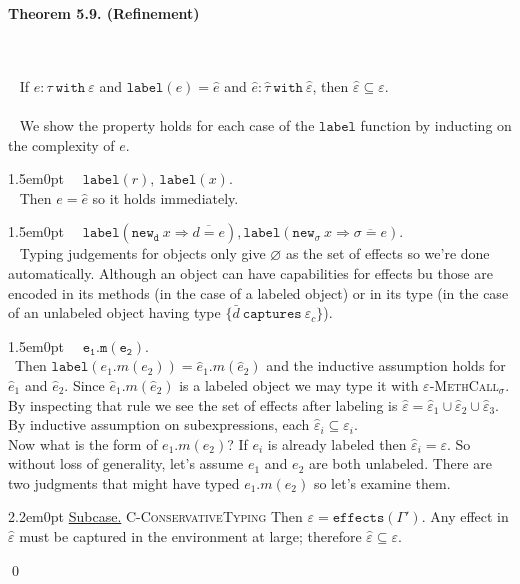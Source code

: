 \documentclass{llncs}
\newcommand{\keywadj}[1]{\mathtt{#1}}
\newcommand{\keyw}[1]{\keywadj{#1}~}
\newcommand{\thm}[3]{
	\begin{large}
		\bf{#1}
	\end{large} \\\\
	\fbox{Statement.} ~ #2
	\fbox{Proof.}~ #3 \qed
}
\newcommand{\proofcase}[2]{
	\begin{adjustwidth}{1.5em}{0pt}
		\fbox{Case.}~~#1. \\ ~#2
	\end{adjustwidth}
}
\newcommand{\subcase}[1] {
	\begin{adjustwidth}{2.2em}{0pt}
		\underline{Subcase.} #1
	\end{adjustwidth}
}
\begin{document}
\thm{Theorem 5.9. (Refinement)}
{If $e : \tau~\keyw{with} \varepsilon$ and $\keywadj{label}(e) = \hat e$ and $\hat e : \hat \tau~\keyw{with} \hat \varepsilon$, then $\hat \varepsilon \subseteq \varepsilon$.\\\\}
{We show the property holds for each case of the $\keywadj{label}$ function by inducting on the complexity of $e$.

\proofcase{$\keywadj{label}(r),~\keywadj{label}(x)$}{
	Then $e = \hat e$ so it holds immediately.
}
	
\proofcase{$\keywadj{label}(\keyw{new_d} x \Rightarrow \overline{d = e}), \keywadj{label}(\keyw{new_\sigma} x \Rightarrow \overline{\sigma = e})$}{
Typing judgements for objects only give $\varnothing$ as the set of effects so we're done automatically. Although an object can have capabilities for effects bu those are encoded in its methods (in the case of a labeled object) or in its type (in the case of an unlabeled object having type $\{ \bar d~\keyw{captures} \varepsilon_c\}$).
}	
	
\proofcase{$\keywadj{e_1.m(e_2)}$}{Then $\keywadj{label}(e_1.m(e_2)) = \hat e_1 . m(\hat e_2)$ and the inductive assumption holds for $\hat e_1$ and $\hat e_2$. Since $\hat e_1 . m(\hat e_2)$ is a labeled object we may type it with \textsc{$\varepsilon$-MethCall$_\sigma$}. By inspecting that rule we see the set of effects after labeling is $\hat \varepsilon = \hat \varepsilon_1 \cup \hat \varepsilon_2 \cup \hat \varepsilon_3$. By inductive assumption on subexpressions, each $\hat \varepsilon_i \subseteq \varepsilon_i$. \\

\noindent
Now what is the form of $e_1.m(e_2)$? If $e_i$ is already labeled then $\hat \varepsilon_i = \varepsilon$. So without loss of generality, let's assume $e_1$ and $e_2$ are both unlabeled. There are two judgments that might have typed $e_1.m(e_2)$ so let's examine them.



	\subcase{\textsc{C-ConservativeTyping}
	Then $\varepsilon = \keywadj{effects}(\Gamma')$. Any effect in $\hat \varepsilon$ must be captured in the environment at large; therefore $\hat \varepsilon \subseteq \varepsilon$.
	}

}}
\end{document}
